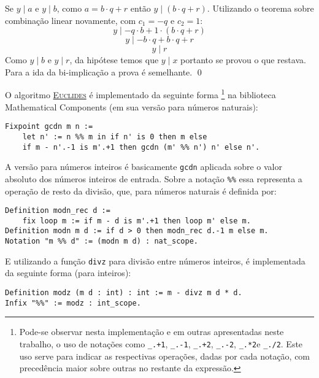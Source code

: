         Se $y \mid a$ e $y \mid b$, como $a = b \cdot q + r$ então
        $y \mid (b \cdot q + r)$. Utilizando o teorema sobre combinação linear novamente, com $c_1 = -q$ e $c_2 = 1$:
        \begin{equation*}
            y \mid -q \cdot b + 1 \cdot (b \cdot q + r) 
        \end{equation*}
        \begin{equation*}
            y \mid - b \cdot q + b \cdot q + r 
        \end{equation*}
        \begin{equation*}
            y \mid r 
        \end{equation*}
        Como $y \mid b$ e $y \mid r$, da hipótese temos que $y \mid x$ portanto se provou o que restava. Para a ida da bi-implicação a prova é semelhante. \qed

O algoritmo \hyperref[algo:euclides]{\textsc{Euclides}} é implementado da seguinte forma \footnote{Pode-se observar nesta implementação e em outras apresentadas neste trabalho, o uso de notações como \codequotes\lstinline[language=coq-error]|_.+1|\codequotes, \codequotes\lstinline[language=coq]|_.-1|\codequotes, \codequotes\lstinline[language=coq]|_.+2|\codequotes, \codequotes\lstinline[language=coq]|_.-2|\codequotes, \codequotes\lstinline[language=coq]|_.*2|\codequotes\;e \codequotes\lstinline[language=coq]|_./2|\codequotes. Este uso serve para indicar as respectivas operações, dadas por cada notação, com precedência maior sobre outras no restante da expressão.} na biblioteca Mathematical Components (em sua versão para números naturais):
    \begin{lstlisting}[language=coq,frame=single,tabsize=1]
Fixpoint gcdn m n :=
    let n' := n %% m in if n' is 0 then m else
    if m - n'.-1 is m'.+1 then gcdn (m' %% n') n' else n'.
    \end{lstlisting}
A versão para números inteiros é basicamente \lstinline[language = coq]{gcdn} aplicada sobre o valor absoluto dos números inteiros de entrada.
Sobre a notação \lstinline[language = coq]{%%} essa representa a operação de resto da divisão, que, para números naturais é definida por:
    \begin{lstlisting}[language=coq,frame=single,tabsize=1]
Definition modn_rec d := 
    fix loop m := if m - d is m'.+1 then loop m' else m.
Definition modn m d := if d > 0 then modn_rec d.-1 m else m.
Notation "m %% d" := (modn m d) : nat_scope.
    \end{lstlisting}
E utilizando a função 
\lstinline[language = coq]{divz} para divisão entre números inteiros, é implementada da seguinte forma (para inteiros):
    \begin{lstlisting}[language=coq,frame=single,tabsize=1]
Definition modz (m d : int) : int := m - divz m d * d.
Infix "%%" := modz : int_scope.
    \end{lstlisting}

